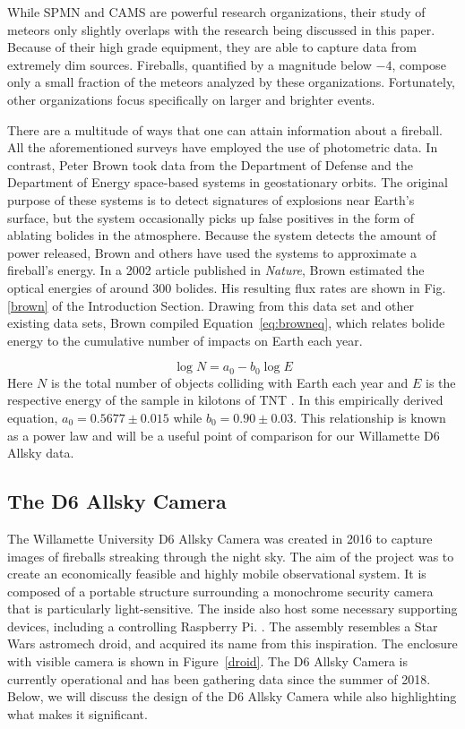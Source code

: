 While SPMN and CAMS are powerful research organizations, their study of meteors only slightly overlaps with the research being discussed in this paper.
Because of their high grade equipment, they are able to capture data from extremely dim sources.
Fireballs, quantified by a magnitude below $-4$, compose only a small fraction of the meteors analyzed by these organizations.
Fortunately, other organizations focus specifically on larger and brighter events.

There are a multitude of ways that one can attain information about a fireball.  
All the aforementioned surveys have employed the use of photometric data.
In contrast, Peter Brown took data from the Department of Defense and the Department of Energy space-based systems in geostationary orbits.
The original purpose of these systems is to detect signatures of explosions near Earth's surface, but the system occasionally picks up false positives in the form of ablating bolides in the atmosphere.  
Because the system detects the amount of power released, Brown and others have used the systems to approximate a fireball's energy.
In a 2002 article published in \textit{Nature}, Brown estimated the optical energies of around 300 bolides.
His resulting flux rates are shown in Fig. \ref{brown} of the Introduction Section.
Drawing from this data set and other existing data sets, Brown compiled Equation~\ref{eq:browneq}, which relates bolide energy to the cumulative number of impacts on Earth each year. 

\begin{equation}
\log N = a_0 - b_0\log E
\label{eq:browneq}
\end{equation}
Here $N$ is the total number of objects colliding with Earth each year and $E$ is the respective energy of the sample in kilotons of TNT \cite{brown_p_flux_2002}.
In this empirically derived equation, $a_0 = 0.5677 \pm 0.015$ while $b_0 = 0.90 \pm 0.03$.
This relationship is known as a power law and will be a useful point of comparison for our Willamette D6 Allsky data.




\subsection{The D6 Allsky Camera}

The Willamette University D6 Allsky Camera was created in 2016 to capture images of fireballs streaking through the night sky.
The aim of the project was to create an economically feasible and highly mobile observational system.
It is composed of a portable structure surrounding a monochrome security camera that is particularly light-sensitive.
The inside also host some necessary supporting devices, including a controlling Raspberry Pi. \cite{mcswain_using_2016}.
The assembly resembles a Star Wars astromech droid, and acquired its name from this inspiration.
The enclosure with visible camera is shown in Figure~\ref{droid}.
The D6 Allsky Camera is currently operational and has been gathering data since the summer of 2018.  
Below, we will discuss the design of the D6 Allsky Camera while also highlighting what makes it significant.

